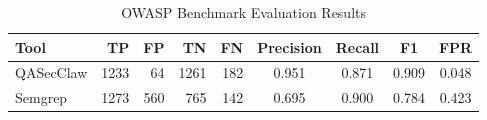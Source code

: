 \begin{table}[ht]
\centering
\caption{OWASP Benchmark Evaluation Results}
\label{tab:benchmark-results}
\begin{tabular}{lrrrrcccc}
\toprule
Tool & TP & FP & TN & FN & Precision & Recall & F1 & FPR \\
\midrule
QASecClaw & 1233 & 64 & 1261 & 182 & 0.951 & 0.871 & 0.909 & 0.048 \\
Semgrep & 1273 & 560 & 765 & 142 & 0.695 & 0.900 & 0.784 & 0.423 \\
\bottomrule
\end{tabular}
\end{table}